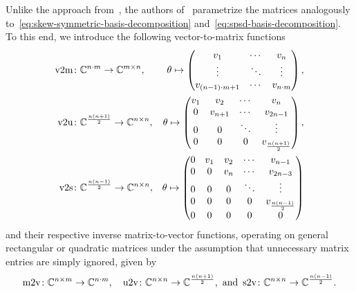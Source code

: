 Unlike the approach from~\cite{Najnudel2021}, the authors of~\cite{Schwerdtner2021, SV2021, Schwerdtner2023, SV2023} parametrize the matrices analogously to~\eqref{eq:skew-symmetric-basis-decomposition} and~\eqref{eq:spsd-basis-decomposition}.
To this end, we introduce the following vector-to-matrix functions
\begin{equation}\label{eq:v2m}
    \begin{alignedat}{3}
        \mathop{}\!\mathrm{v}2\mathrm{m} &\colon \mathbb{C}^{n \cdot m} \to \mathbb{C}^{m \times n},\quad &\theta \mapsto \begin{pmatrix}
            v_1 & \cdots & v_n \\
            \vdots & \ddots & \vdots \\
            v_{(n - 1) \cdot m + 1} & \cdots & v_{n \cdot m}
        \end{pmatrix}, \\
        \mathop{}\!\mathrm{v}2\mathrm{u} &\colon \mathbb{C}^{\frac{n (n + 1)}{2}} \to \mathbb{C}^{n \times n},\quad &\theta \mapsto \begin{pmatrix}
            v_1 & v_2 & \cdots & v_n \\
            0 & v_{n + 1} & \cdots & v_{2n - 1} \\
            0 & 0 & \ddots & \vdots \\
            0 & 0 & 0 & v_{\frac{n (n + 1)}{2}}
        \end{pmatrix},\\
        \mathop{}\!\mathrm{v}2\mathrm{s} &\colon \mathbb{C}^{\frac{n (n - 1)}{2}} \to \mathbb{C}^{n \times n},\quad &\theta \mapsto \begin{pmatrix}
            0 & v_1 & v_2 & \cdots & v_{n - 1} \\
            0 & 0 & v_n & \cdots & v_{2n - 3} \\
            0 & 0 & 0 & \ddots & \vdots \\
            0 & 0 & 0 & 0 & v_{\frac{n (n - 1)}{2}} \\
            0 & 0 & 0 & 0 & 0
        \end{pmatrix}
    \end{alignedat}
\end{equation}
and their respective inverse matrix-to-vector functions, operating on general rectangular or quadratic matrices under the assumption that unnecessary matrix entries are simply ignored, given by
\begin{equation}\label{eq:m2v-functions}
    \mathop{}\!\mathrm{m}2\mathrm{v} \colon \mathbb{C}^{n \times m} \to \mathbb{C}^{n \cdot m},\quad \mathop{}\!\mathrm{u}2\mathrm{v} \colon \mathbb{C}^{n \times n} \to \mathbb{C}^{\frac{n (n + 1)}{2}}, \text{ and } \mathop{}\!\mathrm{s}2\mathrm{v} \colon \mathbb{C}^{n \times n} \to \mathbb{C}^{\frac{n (n - 1)}{2}}.
\end{equation}
